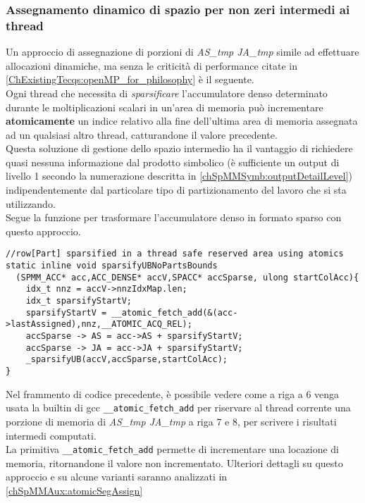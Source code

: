 \subsubsection{Assegnamento dinamico di spazio per non zeri intermedi ai thread} \label{chSpMMNum:mallocReplaceAssigns}
Un approccio di assegnazione di porzioni di \emph{AS\_tmp JA\_tmp} simile ad effettuare allocazioni 
dinamiche, ma senza le criticità di performance citate in \ref{ChExistingTecqs:openMP_for_philosophy}
è il seguente.\\
\label{chSpMMNum:sparsifyMallocReplace}
Ogni thread che necessita di \emph{sparsificare} l'accumulatore denso determinato durante 
le moltiplicazioni scalari in un'area di memoria può incrementare {\bf{atomicamente}} un 
indice relativo alla fine dell'ultima area di memoria assegnata ad un qualsiasi altro thread,
catturandone il valore precedente.\\
\label{chSpMMNum:sparsifyMallocReplace_EASY_INTEGRATION_IN_EVERY_UB_PARTITIONING}
Questa soluzione di gestione dello spazio intermedio ha il vantaggio di richiedere quasi
nessuna informazione dal prodotto simbolico (è sufficiente un output di livello 1 secondo la numerazione descritta in \ref{chSpMMSymb:outputDetailLevel})
indipendentemente dal particolare tipo di partizionamento del lavoro che si sta utilizzando.\\
Segue la funzione per trasformare l'accumulatore denso in formato sparso con questo approccio.\\
\begin{lstlisting}
//row[Part] sparsified in a thread safe reserved area using atomics
static inline void sparsifyUBNoPartsBounds
  (SPMM_ACC* acc,ACC_DENSE* accV,SPACC* accSparse, ulong startColAcc){
    idx_t nnz = accV->nnzIdxMap.len;
    idx_t sparsifyStartV;
    sparsifyStartV = __atomic_fetch_add(&(acc->lastAssigned),nnz,__ATOMIC_ACQ_REL); 
    accSparse -> AS = acc->AS + sparsifyStartV;
    accSparse -> JA = acc->JA + sparsifyStartV;
    _sparsifyUB(accV,accSparse,startColAcc);
}
\end{lstlisting}
Nel frammento di codice precedente, è possibile vedere come a riga a 6 venga usata
la builtin di gcc \verb|__atomic_fetch_add| \cite{gcc10.1}
per riservare al thread corrente una porzione di memoria di \emph{AS\_tmp JA\_tmp}
a riga 7 e 8, per scrivere i risultati intermedi computati.\\
La primitiva \verb|__atomic_fetch_add| permette di incrementare una locazione 
di memoria, ritornandone il valore non incrementato.
Ulteriori dettagli su questo approccio e su alcune varianti saranno analizzati in \ref{chSpMMAux:atomicSegAssign}

